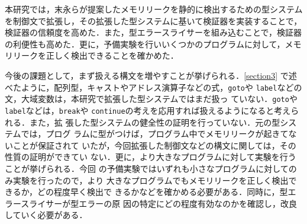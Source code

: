 本研究では，末永らが提案したメモリリークを静的に検出するための型システム
を制御文で拡張し，その拡張した型システムに基いて検証器を実装することで，
検証器の信頼度を高めた．また，型エラースライサーを組み込むことで，検証器
の利便性も高めた．更に，予備実験を行いいくつかのプログラムに対して，メモ
リリークを正しく検出できることを確かめた．

今後の課題として，まず扱える構文を増やすことが挙げられる．\ref{section3}
で述べたように，配列型，キャストやアドレス演算子などの式，\texttt{goto}や
\texttt{label}などの文，大域変数は，本研究で拡張した型システムではまだ扱っ
ていない．\texttt{goto}や\texttt{label}などは，\texttt{break}や
\texttt{continue}の考えを応用すれば扱えるようになると考えられる．また，拡
張した型システムの健全性の証明を行っていない．元の型システムでは，プログ
ラムに型がつけば，プログラム中でメモリリークが起きてないことが保証されて
いたが，今回拡張した制御文などの構文に関しては，その性質の証明ができてい
ない．更に，より大きなプログラムに対して実験を行うことが挙げられる．今回
の予備実験ではいずれも小さなプログラムに対してのみ実験を行ったので，より
大きなプログラムでもメモリリークを正しく検出できるか，どの程度早く検出で
きるかなどを確かめる必要がある．同時に，型エラースライサーが型エラーの原
因の特定にどの程度有効なのかを確認し，改良していく必要がある．